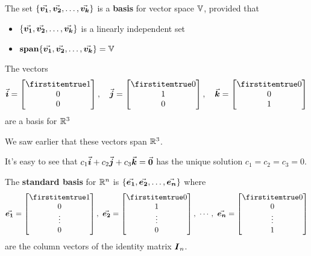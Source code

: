 \documentclass{beamer}
\begin{document}
\begin{frame}
\begin{definition}
The set $\{{\vec{\boldsymbol{v_1}}},{\vec{\boldsymbol{v_2}}},\ldots,{\vec{\boldsymbol{v_k}}}\}$ is a \textbf{basis} for vector space $\mathbb{V}$, provided that
\begin{itemize}
\item $\{{\vec{\boldsymbol{v_1}}},{\vec{\boldsymbol{v_2}}},\ldots,{\vec{\boldsymbol{v_k}}}\}$ is a linearly independent set
\item $\operatorname{\textbf{span}}\{{\vec{\boldsymbol{v_1}}},{\vec{\boldsymbol{v_2}}},\ldots,{\vec{\boldsymbol{v_k}}}\}=\mathbb{V}$
\end{itemize}
\end{definition}\pause
\begin{example}
The vectors
\begin{equation*}
\vect{i}=\bvector{1,0,0},\quad
\vect{j}=\bvector{0,1,0},\quad
\vect{k}=\bvector{0,0,1}
\end{equation*}
are a basis for $\mathbb{R}^3$\pause

We saw earlier that these vectors span $\mathbb{R}^3$.\pause

It's easy to see that $c_1{\vec{\boldsymbol{i}}}+c_2{\vec{\boldsymbol{j}}}+c_3{\vec{\boldsymbol{k}}}={\vec{\boldsymbol{0}}}$ has the unique solution $c_1=c_2=c_3=0$.
\end{example}
\end{frame}

\begin{frame}
\begin{definition}
The \textbf{standard basis} for $\mathbb{R}^n$ is $\{{\vec{\boldsymbol{e_1}}},{\vec{\boldsymbol{e_2}}},\dots,{\vec{\boldsymbol{e_n}}}\}$
where
\begin{equation*}
\vect{e_1}=\bvector{1,0,\vdots,0},\ 
\vect{e_2}=\bvector{0,1,\vdots,0},\ 
\cdots,\ 
\vect{e_n}=\bvector{0,0,\vdots,1}
\end{equation*}
are the column vectors of the identity matrix $\boldsymbol{I}_{n}$.
\end{definition}
\end{frame}
\end{document}
